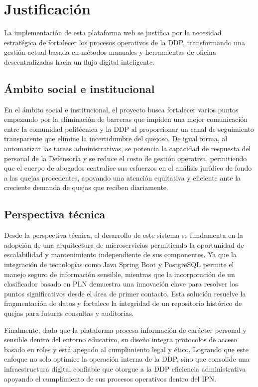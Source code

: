 \section{Justificación}
La implementación de esta plataforma web se justifica por la necesidad estratégica de fortalecer los procesos operativos de la DDP, transformando una gestión actual basada en métodos manuales y herramientas de oficina descentralizadas hacia un flujo digital inteligente.

\subsection{Ámbito social e institucional}
En el ámbito social e institucional, el proyecto busca fortalecer varios puntos empezando por la eliminación de barreras que impiden una mejor comunicación entre la comunidad politécnica y la DDP al proporcionar un canal de seguimiento transparente que elimine la incertidumbre del quejoso. De igual forma, al automatizar las tareas administrativas, se potencia la capacidad de respuesta del personal de la Defensoría y se reduce el costo de gestión operativa, permitiendo que el cuerpo de abogados centralice sus esfuerzos en el análisis jurídico de fondo a las quejas procedentes, apoyando una atención equitativa y eficiente ante la creciente demanda de quejas que reciben diariamente.

\subsection{Perspectiva técnica}
Desde la perspectiva técnica, el desarrollo de este sistema se fundamenta en la adopción de una arquitectura de microservicios permitiendo la oportunidad de escalabilidad y mantenimiento independiente de sus componentes. Ya que la integración de tecnologías como Java Spring Boot y PostgreSQL permite el manejo seguro de información sensible, mientras que la incorporación de un clasificador basado en PLN demuestra una innovación clave para resolver los puntos significativos desde el área de primer contacto. Esta solución resuelve la fragmentación de datos y fortalece la integridad de un repositorio histórico de quejas para futuras consultas y auditorias.

Finalmente, dado que la plataforma procesa información de carácter personal y sensible dentro del entorno educativo, su diseño integra protocolos de acceso basado en roles y está apegado al cumplimiento legal y ético. Logrando que este enfoque no solo optimice la operación interna de la DDP, sino que consolide una infraestructura digital confiable que otorgue a la DDP eficiencia administrativa apoyando el cumplimiento de sus procesos operativos dentro del IPN.

